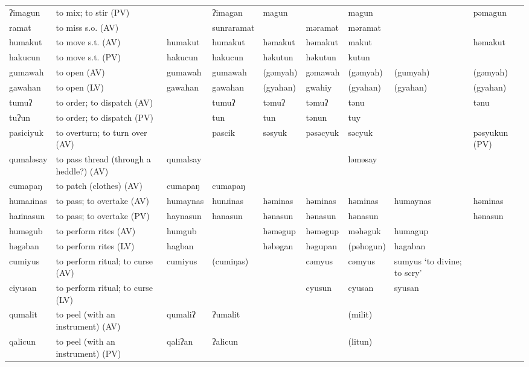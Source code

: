 \begin{landscape}
\begin{longtable}{*{9}{>{\raggedright\arraybackslash}p{}}}
\text{*}ʔimagun      & to mix; to stir (PV) &  & ʔimagan & magun &  & magun &  & pəmagun\\
\text{*}ramat       & to miss s.o. (AV) &  & sunraramat &  & məramat & məramat &  & \\
\text{*}humakut      & to move s.t. (AV) & humakut & humakut & həmakut & həmakut & makut &  & həmakut\\
\text{*}hakucun      & to move s.t. (PV) & hakucun & hakucun & həkutun & həkutun & kutun &  & \\
\text{*}gumawah      & to open (AV) & gumawah & gumawah & (gəmyah) & gəmawah & (gəmyah) & (gumyah) & (gəmyah)\\
\text{*}gawahan      & to open (LV) & gawahan & gawahan & (gyahan) & gwahiy & (gyahan) & (gyahan) & (gyahan)\\
\text{*}tumuʔ        & to order; to dispatch (AV) &  & tumuʔ & təmuʔ & təmuʔ & tənu &  & tənu\\
\text{*}tuʔun        & to order; to dispatch (PV) &  & tun & tun & tənun & tuy &  & \\
\text{*}pasiciyuk    & to overturn; to turn over (AV) &  & pascik & səsyuk & pəsəcyuk & səcyuk &  & pəsyukun (PV)\\
\text{*}qumaləsay    & to pass thread (through a heddle?) (AV) & qumalsay &  &  &  & ləməsay &  & \\
\text{*}cumapaŋ      & to patch (clothes) (AV) & cumapaŋ & cumapaŋ &  &  &  &  & \\
\text{*}humaɹinas    & to pass; to overtake (AV) & humaynas & hunɹinas & həminas & həminas & həminas & humaynas & həminas\\
\text{*}haɹinasun    & to pass; to overtake (PV) & haynasun & hanasun & hənasun & hənasun & hənasun &  & hənasun\\
\text{*}huməgub      & to perform rites (AV) & humgub &  & həməgup & həməgup & məhəguk & humagup & \\
\text{*}həgəban      & to perform rites (LV) & hagban &  & həbəgan & həgupan & (pəhogun) & hagaban & \\
\text{*}cumiyus      & to perform ritual; to curse (AV) & cumiyus & (cumiŋas) &  & cəmyus & cəmyus & sumyus `to divine; to scry' & \\
\text{*}ciyusan      & to perform ritual; to curse (LV) &  &  &  & cyusun & cyusan & syusan & \\
\text{*}qumalit      & to peel (with an instrument) (AV) & qumaliʔ & ʔumalit &  &  & (milit) &  & \\
\text{*}qalicun      & to peel (with an instrument) (PV) & qaliʔan & ʔalicun &  &  & (litun) &  & \\

\end{longtable}
\end{landscape}

